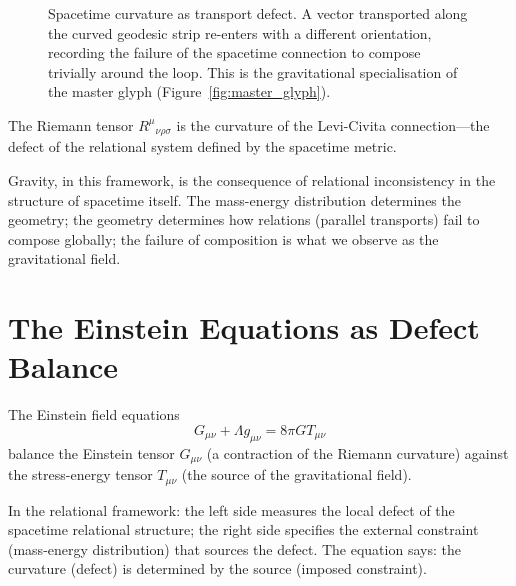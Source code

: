\documentclass[12pt,a4paper,openany]{book}
\theoremstyle{plain}
\theoremstyle{definition}
\theoremstyle{remark}
\begin{document}
\begin{figure}[h]
\centering
{}
\caption[GR transport glyph, Chapter~10: general relativity]{Spacetime curvature as transport defect. A vector transported along the curved geodesic strip re-enters with a different orientation, recording the failure of the spacetime connection to compose trivially around the loop. This is the gravitational specialisation of the master glyph (Figure~\ref{fig:master_glyph}).}
\label{fig:glyph_gr}
\end{figure}

The Riemann tensor $R^\mu{}_{\nu\rho\sigma}$ is the curvature of the Levi-Civita connection---the defect of the relational system defined by the spacetime metric.

Gravity, in this framework, is the consequence of relational inconsistency in the structure of spacetime itself. The mass-energy distribution determines the geometry; the geometry determines how relations (parallel transports) fail to compose globally; the failure of composition is what we observe as the gravitational field.

\section{The Einstein Equations as Defect Balance}

The Einstein field equations
\[
G_{\mu\nu} + \Lambda g_{\mu\nu} = 8\pi G T_{\mu\nu}
\]
balance the Einstein tensor $G_{\mu\nu}$ (a contraction of the Riemann curvature) against the stress-energy tensor $T_{\mu\nu}$ (the source of the gravitational field).

In the relational framework: the left side measures the local defect of the spacetime relational structure; the right side specifies the external constraint (mass-energy distribution) that sources the defect. The equation says: the curvature (defect) is determined by the source (imposed constraint).
\end{document}
